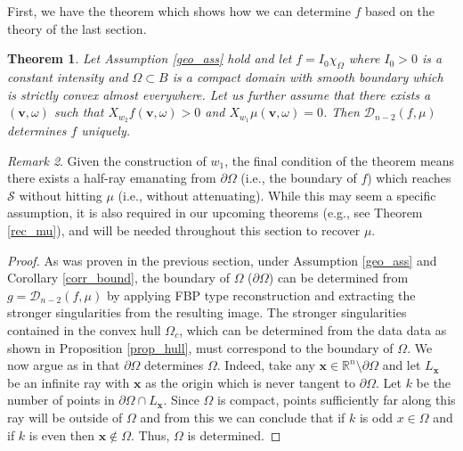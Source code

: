 \documentclass[a4paper,12pt]{amsart}
\numberwithin{equation}{section}
\theoremstyle{plain}
\newtheorem{theorem}{Theorem}
\numberwithin{theorem}{section}
\theoremstyle{definition}
\theoremstyle{remark}
\newtheorem{remark}[theorem]{Remark}
\theoremstyle{remark}
\theoremstyle{remark}
\newcommand{\s}{\mathcal S}
\newcommand{\vv}{{\mathbf{v}}}
\newcommand{\vx}{{\mathbf{x}}}
\begin{document}
{First, we have the theorem which shows how we can determine $f$ based on the theory of the last section.
\begin{theorem}\label{rec_f}
Let Assumption \ref{geo_ass} hold and let $f = I_0 \chi_\Omega$ where $I_0 > 0$ is a constant intensity and $\Omega \subset B$ is a compact domain with smooth boundary which is strictly convex almost everywhere. Let us further assume that there exists a $(\vv,\omega)$ such that $X_{w_2}f(\vv,\omega) > 0$ and $X_{w_1}\mu(\vv,\omega) = 0$. Then $\mathcal{D}_{n-2}(f,\mu)$ determines $f$ uniquely.
\end{theorem}

\begin{remark}
Given the construction of $w_1$, the final condition of the theorem means there exists a half-ray emanating from $\partial \Omega$ (i.e., the boundary of $f$) which reaches $\s$ without hitting $\mu$ (i.e., without attenuating). While this may seem a specific assumption, it is also required in our upcoming theorems (e.g., see Theorem \ref{rec_mu}), and will be needed throughout this section to recover $\mu$. 
\end{remark}
\begin{proof}
As was proven in the previous section, under Assumption \ref{geo_ass} and Corollary \ref{corr_bound}, the boundary of $\Omega$ ($\partial \Omega$) can be determined from $g = \mathcal{D}_{n-2}(f,\mu)$ by applying FBP type reconstruction and extracting the stronger singularities from the resulting image. The stronger singularities contained in the convex hull $\Omega_c$, which can be determined from the data data as shown in Proposition \ref{prop_hull}, must correspond to the boundary of $\Omega$. We now argue as in \cite{Webber2026Microlocal} that $\partial \Omega$ determines $\Omega$. Indeed, take any $\vx \in \mathbb{R}^n\setminus \partial \Omega$ and let $L_\vx$ be an infinite ray with $\vx$ as the origin which is never tangent to $\partial \Omega$. Let $k$ be the number of points in $\partial \Omega \cap L_\vx$.  Since $\Omega$ is compact, points sufficiently far along this ray will be outside of $\Omega$ and from this we can conclude that if $k$ is odd $x \in \Omega$ and if $k$ is even then $\vx \notin \Omega$. Thus, $\Omega$ is determined.


\end{proof}}
\end{document}

